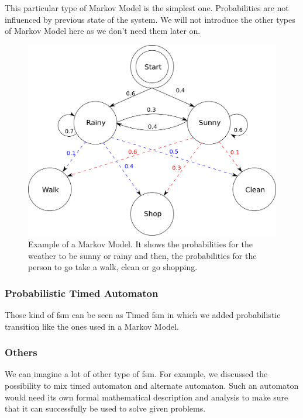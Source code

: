 \documentclass[12pt]{article}
\begin{document}
This particular type of Markov Model is the simplest one. Probabilities are not influenced by previous state of the system. We will not introduce the other types of Markov Model here as we don't need them later on.

\begin{figure}
    \centering
    \includegraphics[scale=0.3]{MarkovModel.png}
    \caption{Example of a Markov Model. It shows the probabilities for the weather to be sunny or rainy and then, the probabilities for the person to go take a walk, clean or go shopping.}
    \label{MarkovModel}
\end{figure}

\subsubsection{Probabilistic Timed Automaton}

Those kind of \gls{fsm} can be seen as Timed \gls{fsm} in which we added probabilistic transition like the ones used in a Markov Model.

\subsubsection{Others}

We can imagine a lot of other type of \gls{fsm}. For example, we discussed the possibility to mix timed automaton and alternate automaton. Such an automaton would need its own formal mathematical description and analysis to make sure that it can successfully be used to solve given problems.\\
\end{document}
